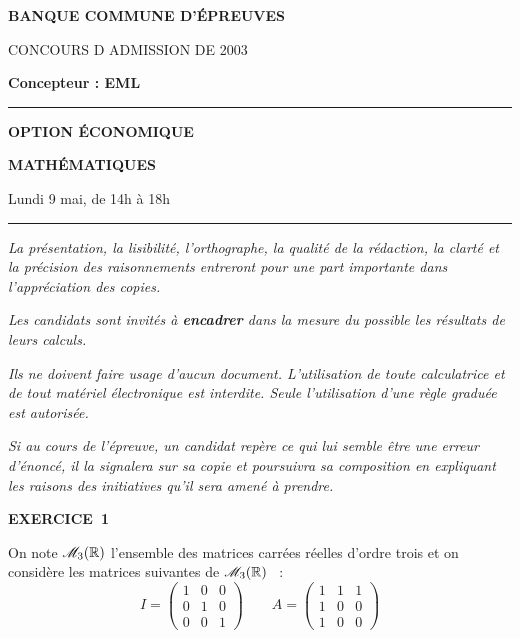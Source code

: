 \documentclass[11pt]{article}%
\begin{document}

\begin{center}
{\LARG\E\textbf{BANQUE COMMUNE D'ÉPREUVES}}



{\large \textsc{CONCOURS D ADMISSION DE 2003}}



{\large \textbf{Concepteur : EML}}



\rule{2.39cm}{0.05cm}



{\Large \textbf{OPTION ÉCONOMIQUE}}



{\Large \textbf{MATHÉMATIQUES }}



{\Large Lundi 9 mai, de 14h à 18h}



\rule{2.39cm}{0.05cm}
\end{center}

\textit{La présentation, la lisibilité, l'orthographe, la qualité
de la rédaction, la clarté et la précision des raisonnements
entreront pour une part importante dans l'appréciation des copies.}

\textit{Les candidats sont invités à \textbf{encadrer} dans la mesure
du possible les résultats de leurs calculs.}

\textit{Ils ne doivent faire usage d'aucun document. L'utilisation de
toute
calculatrice et de tout matériel électronique est interdite. Seule
l'utilisation d'une règle graduée est autorisée.}

\textit{Si au cours de l'épreuve, un candidat repère ce qui lui semble
être une erreur d'énoncé, il la signalera sur sa copie et
poursuivra sa composition en expliquant les raisons des initiatives
qu'il sera
amené à prendre.}

\vspace*{3cm}


\begin{center}
{\large \textbf{EXERCICE~1} }
\end{center}

On note $\mathscr{M}_{3}(\mathbb{R}) $ l'ensemble des matrices
carrées réelles d'ordre trois et on considère les matrices
suivantes de $\mathscr{M}_{3}(\mathbb{R}) $~ : {\large 
\[
I = \left( 
\begin{array}{ccc}
1 & 0 & 0 \\
0 & 1 & 0 \\
0 & 0 & 1
\end{array}
\right) \qquad A = \left( 
\begin{array}{ccc}
1 & 1 & 1 \\
1 & 0 & 0 \\
1 & 0 & 0
\end{array}
\right) 
\]
}
\end{document}
